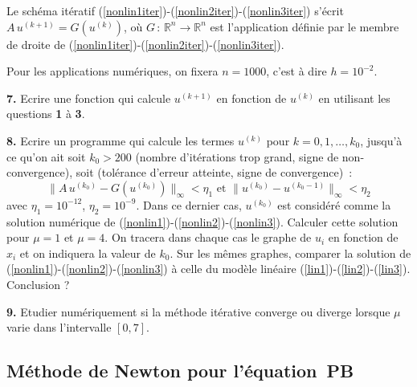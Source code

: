 \documentclass[a4paper,10pt]{article}
\begin{document}
Le sch\'ema it\'eratif (\ref{nonlin1iter})-(\ref{nonlin2iter})-(\ref{nonlin3iter}) s'\'ecrit
$A\, u^{(k+1)} = G(u^{(k)})$, o\`u $G\, : \, \mathbb{R}^n \rightarrow \mathbb{R}^n$ est l'application 
d\'efinie par le membre de droite de (\ref{nonlin1iter})-(\ref{nonlin2iter})-(\ref{nonlin3iter}).

\vspace{1ex}

Pour les applications num\'eriques, on fixera $n=1000$, c'est \`a dire
$h=10^{-2}$.

\vspace{1ex}

\noindent
{\bf 7.} Ecrire une fonction qui calcule $u^{(k+1)}$ en fonction de $u^{(k)}$ en utilisant les questions {\bf 1} \`a {\bf 3}.

\vspace{1ex}

\noindent
{\bf 8.} Ecrire un programme qui calcule les termes $u^{(k)}$ pour $k=0,1,\ldots , k_0$, jusqu'\`a ce qu'on ait soit $k_0 > 200$ 
(nombre d'it\'erations trop grand, signe de non-convergence), soit (tol\'erance d'erreur atteinte, signe de convergence)~:
$$
\| A\, u^{(k_0)} - G(u^{(k_0)})  \|_\infty < \eta_1
 \mbox{~et~} \| u^{(k_0)} - u^{(k_0 -1)} \|_\infty < \eta_2
$$
avec $\eta_1 = 10^{-12}$, $\eta_2 = 10^{-9}$.
Dans ce dernier cas, $u^{(k_0)}$ est consid\'er\'e comme la solution num\'erique de (\ref{nonlin1})-(\ref{nonlin2})-(\ref{nonlin3}).
Calculer cette solution pour $\mu =1$ et $\mu =4$.
On tracera dans chaque cas le graphe de $u_i$ en fonction de $x_i$
et on indiquera la valeur de $k_0$. 
Sur les m\^emes graphes, comparer
la solution de (\ref{nonlin1})-(\ref{nonlin2})-(\ref{nonlin3}) \`a celle du mod\`ele lin\'eaire 
(\ref{lin1})-(\ref{lin2})-(\ref{lin3}). Conclusion ?

\vspace{1ex}

\noindent
{\bf 9.} Etudier num\'eriquement si la m\'ethode it\'erative converge ou diverge lorsque $\mu$ varie dans l'intervalle $[0,7]$.

\subsection{\label{mod2N}M\'ethode de Newton pour l'\'equation~PB}
\end{document}
